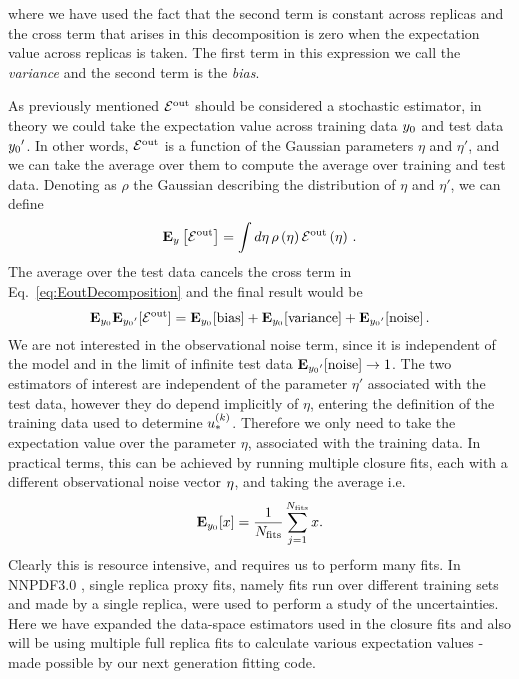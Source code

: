 where we have used the fact that the second term is constant across replicas and
the cross term that arises in this decomposition is zero when the expectation
value across replicas is taken. The first term in this expression we call the
{\em variance} and the second term is the {\em bias}.

As previously mentioned $\mathcal{E}^{\rm out}$ should be considered a stochastic estimator, in
theory we could take the expectation value across training data $y_0$
and test data ${{y_0}^{\prime}}$. 
In other words, $\mathcal{E}^{\rm out}$ is a function of the Gaussian parameters $\eta$ and $\eta'$,
and we can take the average over them to compute the average over training and test data. 
Denoting as $\rho$ the Gaussian describing the distribution of $\eta$ and $\eta'$,
we can define
\begin{align}
    \mathbf{E}_{y}\left[\mathcal{E}^{\rm out}\right] = \int d\eta\, \rho\left(\eta\right) \mathcal{E}^{\rm out}\left(\eta\right)\,.
\end{align}
The average over the test data cancels the cross term in Eq.~\ref{eq:EoutDecomposition}
and the final result would be
\begin{equation}\label{eq:ExpectedBiasVariance}
    \mathbf{E}_{y_0} \mathbf{E}_{{{y_0}^{\prime}}}[\mathcal{E}^{\rm out}] =
    \mathbf{E}_{y_0}[{\rm bias}] + 
    \mathbf{E}_{y_0}[{\rm variance}] +
    \mathbf{E}_{{{y_0}^{\prime}}}[{\rm noise}]\,.
\end{equation}
We are not interested in the observational noise term, since it is independent
of the model and in the limit of infinite test data
$\mathbf{E}_{{{y_0}^{\prime}}}[{\rm noise}] \to 1$. The two estimators of
interest are independent of the parameter $\eta'$ associated with the test data,
however they do depend implicitly of $\eta$, entering the definition of the training data used to determine
$u_*^{(k)}$.
Therefore we only need to take
the expectation value over the parameter $\eta$, associated with the training data. 
In practical terms, this can be
achieved by running multiple closure fits, each with a different observational
noise vector $\eta$, and taking the average i.e.
\begin{equation}
    \label{eq:average_over_training_data}
    \mathbf{E}_{y_0}[ x ] = \frac{1}{N_{\rm fits}} \sum_{j=1}^{N_{\rm fits}} x.
\end{equation}
Clearly this is resource intensive, and requires us to perform many fits. In
NNPDF3.0 \cite{nnpdf30}, single replica proxy fits, namely fits run 
over different training sets and made by a single replica,
were used to perform a study of the uncertainties. 
Here we have expanded the data-space estimators used in
the closure fits and also will be using multiple full replica fits to calculate
various expectation values - made possible by our next generation fitting code.

